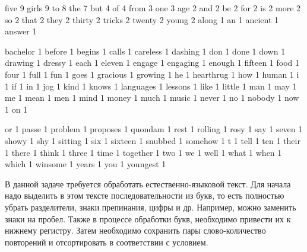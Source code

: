 \begin{myverbbox}[\small]{\voutput}
    five 9
    girls 9
    to 8
    the 7
    but 4
    of 4
    from 3
    one 3
    age 2
    and 2
    be 2
    for 2
    is 2
    more 2
    so 2
    that 2
    they 2
    thirty 2
    tricks 2
    twenty 2
    young 2
    along 1
    an 1
    ancient 1
    answer 1
\end{myverbbox}

\begin{myverbbox}[\small]{\voutput}
    bachelor 1
    before 1
    begins 1
    calls 1
    careless 1
    dashing 1
    don 1
    done 1
    down 1
    drawing 1
    dressy 1
    each 1
    eleven 1
    engage 1
    engaging 1
    enough 1
    fifteen 1
    food 1
    four 1
    full 1
    fun 1
    goes 1
    gracious 1
    growing 1
    he 1
    hearthrug 1
    how 1
    human 1
    i 1
    if 1
    in 1
    jog 1
    kind 1
    knows 1
    languages 1
    lessons 1
    like 1
    little 1
    man 1
    may 1
    me 1
    mean 1
    men 1
    mind 1
    money 1
    much 1
    music 1
    never 1
    no 1
    nobody 1
    now 1
    on 1
\end{myverbbox}
\outputTable

\begin{myverbbox}[\small]{\voutput}
    or 1
    passe 1
    problem 1
    proposes 1
    quondam 1
    rest 1
    rolling 1
    rosy 1
    say 1
    seven 1
    showy 1
    shy 1
    sitting 1
    six 1
    sixteen 1
    snubbed 1
    somehow 1
    t 1
    tell 1
    ten 1
    their 1
    there 1
    think 1
    three 1
    time 1
    together 1
    two 1
    we 1
    well 1
    what 1
    when 1
    which 1
    winsome 1
    years 1
    you 1
    youngest 1
\end{myverbbox}
\outputTable


\solutionSection

В данной задаче требуется обработать естественно-языковой текст. Для начала надо выделить в этом тексте последовательности из букв, то есть полностью убрать разделители, знаки препинания, цифры и др. Например, можно заменить знаки на пробел. Также в процессе обработки букв, необходимо привести их к нижнему регистру. Затем необходимо сохранить пары слово-количество повторений и отсортировать в соответствии с условием.

